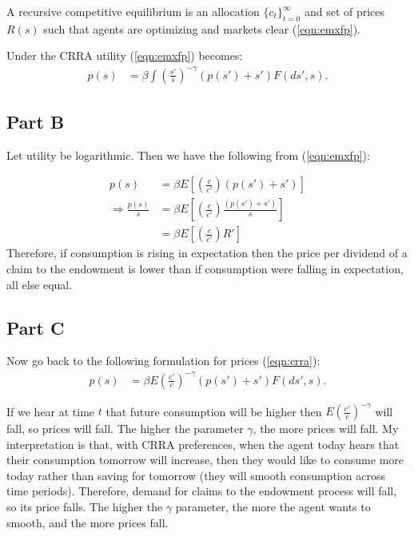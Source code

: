 \documentclass[11pt]{article} %
\begin{document}
A recursive competitive equilibrium is an allocation $\{c_t\}_{t=0}^{\infty}$ and set of prices $R(s)$ such that agents are optimizing and markets clear (\ref{eqn:emxfp}).

Under the CRRA utility (\ref{eqn:emxfp}) becomes:
\begin{align}
p(s) &= \beta\int \left(\frac{s'}{s} \right)^{-\gamma} (p(s') + s' )F(ds',s). \label{eqn:crra}
\end{align}

\subsection{Part B}
Let utility be logarithmic. Then we have the following from (\ref{eqn:emxfp}):

\begin{align*}
p(s) &= \beta E \left[ \left(\frac{c}{c'} \right)(p(s') + s' )\right]\\
\Rightarrow \frac{p(s)}{s} &=  \beta E \left[ \left(\frac{c}{c'} \right)\frac{(p(s') + s' )}{s}\right]\\
&=  \beta E \left[ \left(\frac{c}{c'} \right)R'\right]
\end{align*}
Therefore, if consumption is rising in expectation then the price per dividend of a claim to the endowment is lower than if consumption were falling in expectation, all else equal.
\subsection{Part C}
Now go back to the following formulation for prices (\ref{eqn:crra}):
\begin{align*}
p(s) &= \beta E\left(\frac{c'}{c} \right)^{-\gamma} (p(s') + s' )F(ds',s). 
\end{align*}

If we hear at time $t$ that future consumption will be higher then $E\left(\frac{c'}{c} \right)^{-\gamma}$ will fall, so prices will fall. The higher the parameter $\gamma$, the more prices will fall. My interpretation is that, with CRRA preferences, when the agent today hears that their consumption tomorrow will increase, then they would like to consume more today rather than saving for tomorrow (they will smooth consumption across time periods). Therefore, demand for claims to the endowment process will fall, so its price falls. The higher the $\gamma$ parameter, the more the agent wants to smooth, and the more prices fall.
\end{document}
